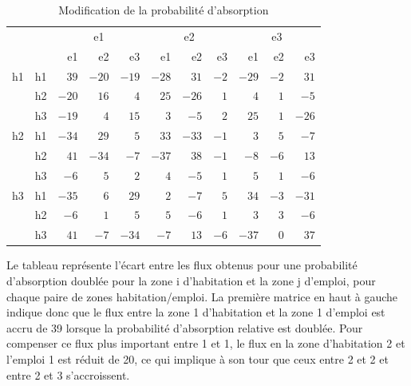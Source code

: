 \documentclass[
  10pt,
  a4paper,
  numbers=noendperiod,
  DIV=9]{scrreprt}
\begin{document}
\hypertarget{tbl-fluxpond}{}
\setlength{\LTpost}{0mm}
\begin{longtable}{l|lrrrrrrrrr}
\caption{\label{tbl-fluxpond}Modification de la probabilité d'absorption }\tabularnewline

\toprule
\multicolumn{1}{l}{} &  & \multicolumn{3}{c}{e1} & \multicolumn{3}{c}{e2} & \multicolumn{3}{c}{e3} \\ 
\cmidrule(lr){3-5} \cmidrule(lr){6-8} \cmidrule(lr){9-11}
\multicolumn{1}{l}{} &  & e1 & e2 & e3 & e1 & e2 & e3 & e1 & e2 & e3 \\ 
\midrule
h1 & h1 & $39$ & $-20$ & $-19$ & $-28$ & $31$ & $-2$ & $-29$ & $-2$ & $31$ \\ 
 & h2 & $-20$ & $16$ & $4$ & $25$ & $-26$ & $1$ & $4$ & $1$ & $-5$ \\ 
 & h3 & $-19$ & $4$ & $15$ & $3$ & $-5$ & $2$ & $25$ & $1$ & $-26$ \\ 
\midrule
h2 & h1 & $-34$ & $29$ & $5$ & $33$ & $-33$ & $-1$ & $3$ & $5$ & $-7$ \\ 
 & h2 & $41$ & $-34$ & $-7$ & $-37$ & $38$ & $-1$ & $-8$ & $-6$ & $13$ \\ 
 & h3 & $-6$ & $5$ & $2$ & $4$ & $-5$ & $1$ & $5$ & $1$ & $-6$ \\ 
\midrule
h3 & h1 & $-35$ & $6$ & $29$ & $2$ & $-7$ & $5$ & $34$ & $-3$ & $-31$ \\ 
 & h2 & $-6$ & $1$ & $5$ & $5$ & $-6$ & $1$ & $3$ & $3$ & $-6$ \\ 
 & h3 & $41$ & $-7$ & $-34$ & $-7$ & $13$ & $-6$ & $-37$ & $0$ & $37$ \\ 
\bottomrule
\end{longtable}
\begin{minipage}{\linewidth}
Le tableau représente l'écart entre les flux obtenus pour une probabilité d'absorption doublée
    pour la zone i d'habitation et la zone j d'emploi, pour chaque paire de zones habitation/emploi. 
    La première matrice en haut à gauche indique donc que le flux entre la zone 1 d'habitation et 
    la zone 1 d'emploi est accru de 39 lorsque la probabilité d'absorption relative est doublée. 
    Pour compenser ce flux plus important entre 1 et 1, le flux en la zone d'habitation 2 et l'emploi 1 est réduit de 20, 
    ce qui implique à son tour que ceux entre 2 et 2 et entre 2 et 3 s'accroissent.\\
\end{minipage}
\end{document}
